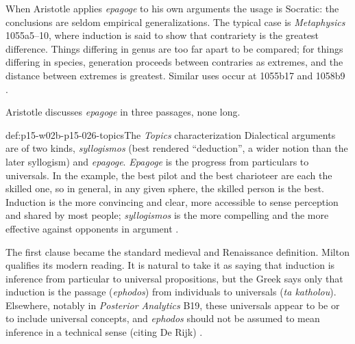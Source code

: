 When Aristotle applies \emph{epagoge} to his own arguments the usage is
Socratic: the conclusions are seldom empirical generalizations. The typical
case is \emph{Metaphysics} 1055a5--10, where induction is said to show that
contrariety is the greatest difference. Things differing in genus are too
far apart to be compared; for things differing in species, generation
proceeds between contraries as extremes, and the distance between extremes
is greatest. Similar uses occur at 1055b17 and 1058b9
\cite[p.~3]{Milton2011InductionBeforeHume}.

Aristotle discusses \emph{epagoge} in three passages, none long.

\begin{hbdefinition}{def:p15-w02b-p15-026-topics}{The \emph{Topics} characterization}
Dialectical arguments are of two kinds, \emph{syllogismos} (best rendered
``deduction'', a wider notion than the later syllogism) and
\emph{epagoge}. \emph{Epagoge} is the progress from particulars to
universals. In the example, the best pilot and the best charioteer are each
the skilled one, so in general, in any given sphere, the skilled person is
the best. Induction is the more convincing and clear,
more accessible to sense perception and shared by most people;
\emph{syllogismos} is the more compelling and the more effective against
opponents in argument \cite[p.~4]{Milton2011InductionBeforeHume}.
\end{hbdefinition}

The first clause became the standard medieval and Renaissance definition.
Milton qualifies its modern reading. It is natural to take it as saying
that induction is inference from particular to universal propositions,
but the Greek says only that induction is the passage (\emph{ephodos})
from individuals to universals (\emph{ta katholou}). Elsewhere, notably in
\emph{Posterior Analytics} B19, these universals appear to be or to include
universal concepts, and \emph{ephodos} should not be assumed to mean
inference in a technical sense (citing De Rijk)
\cite[p.~4]{Milton2011InductionBeforeHume}.

